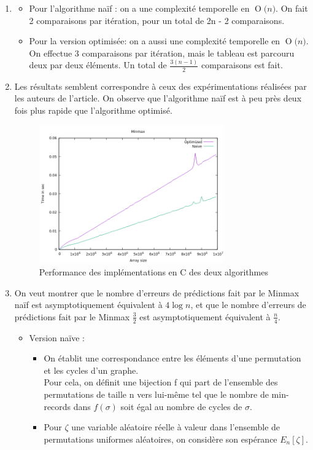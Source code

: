 \documentclass[paper=a4, fontsize=11pt]{scrartcl}
\numberwithin{equation}{section}		%
\numberwithin{figure}{section}			%
\numberwithin{table}{section}				%
\newcommand{\BigO}[1]{\ensuremath{\operatorname{O}\bigl(#1\bigr)}}
\begin{document}
\begin{enumerate}
   	\item
\begin{itemize}
    \item Pour l'algorithme naïf : on a une complexité temporelle en \BigO{n}. On fait 2 comparaisons par itération, pour un total
de 2n - 2 comparaisons.
    \item Pour la version optimisée: on a aussi une complexité temporelle en \BigO{n}. On effectue 3 comparaisons par itération, mais le tableau
est parcouru deux par deux éléments. Un total de \(\frac{3(n - 1)}{2}\) comparaisons est fait.
\end{itemize}

	\item 
Les résultats semblent correspondre à ceux des expérimentations réalisées par les auteurs de l'article.
On observe que l'algorithme naïf est à peu près deux fois plus rapide que l'algorithme optimisé.

\begin{figure}[!ht]
  \caption{Performance des implémentations en C des deux algorithmes}
\centering\includegraphics[width=0.75\textwidth]{minmax10m_c.png}
\end{figure}

\item On veut montrer que le nombre d'erreurs de prédictions fait par le Minmax naïf est asymptotiquement équivalent à $4\log n$, et que le nombre d'erreurs de prédictions fait par le Minmax $\frac{3}{2}$ est asymptotiquement équivalent à $\frac{n}{4}$.

\begin{itemize}
\item Version naïve :

\begin{itemize}[label=$\bullet$]
\item On établit une correspondance entre les éléments d'une permutation et les cycles d'un graphe. \\
Pour cela, on définit une bijection f qui part de l'ensemble des permutations de taille n vers lui-même tel
que le nombre de min-records dans $f(\sigma)$ soit égal au nombre de cycles de $\sigma$.
\item Pour $\zeta$ une variable aléatoire réelle à valeur dans l'ensemble de permutations uniformes aléatoires,
on considère son espérance $E_n[\zeta]$.


\end{itemize}
\end{itemize}
\end{enumerate}
\end{document}
